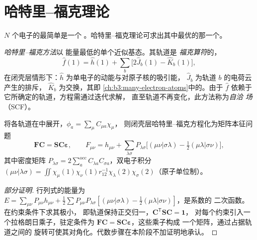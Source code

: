 \section{哈特里–福克理论}

$N$ 个电子的最简单是一个
。哈特里–福克理论可求出其中最优的那一个。

\begin{definition}\label{def:b3:computational-chemistry:hartree-fock}
\emph{哈特里–福克方法}以
能量最低的单个近似基态。其轨道是
\emph{福克算符}的，
\[
\hat f(1) = \hat h(1) + \sum_b\big[2\hat J_b(1) - \hat K_b(1)\big],
\]
在闭壳层情形下：$\hat h$ 为单电子的动能与对原子核的吸引能，
$\hat J_b$ 为轨道 $b$ 的电荷云产生的排斥，
$\hat K_b$ 为交换，其即
\cref{ch:b3:many-electron-atoms}中的。由于 $\hat f$
依赖于它所确定的轨道，方程需通过迭代求解，
直至轨道不再变化，此方法称为\emph{自洽
场}（SCF）。
\end{definition}

\begin{theorem}\label{thm:b3:computational-chemistry:roothaan}
将各轨道在中展开，$\phi_a = \sum_\mu C_{\mu a}\chi_\mu$，
则闭壳层哈特里–福克方程化为矩阵本征问题
\[
\mathbf F\mathbf C = \mathbf S\mathbf C\boldsymbol\varepsilon, \qquad F_{\mu\nu} =
h_{\mu\nu} + \sum_{\lambda\sigma}P_{\lambda\sigma}\big[(\mu\nu|\sigma\lambda) -
\tfrac12(\mu\lambda|\sigma\nu)\big],
\]
其中密度矩阵 $P_{\lambda\sigma} = 2\sum_a^{\mathrm{occ}}C_{\lambda a}C_{\sigma
a}$，双电子积分 $(\mu\nu|\lambda\sigma) = \iint\chi_\mu(1)\chi_\nu(1)
r_{12}^{-1}\chi_\lambda(2)\chi_\sigma(2)$（原子单位制）。
\end{theorem}

\begin{proof}[部分证明]
行列式的能量为 $E = \sum_{\mu\nu}P_{\mu\nu}h_{\mu\nu} + \frac12
\sum P_{\mu\nu}P_{\lambda\sigma}[(\mu\nu|\sigma\lambda) - \frac12(\mu\lambda|\sigma\nu)]$，是系数的
二次函数。在约束条件下求其极小，
即轨道保持正交归一，$\mathbf C^{\mathsf T}\mathbf S\mathbf C = \mathbf 1$，
对每个约束引入一个拉格朗日乘子，驻定条件为
$\mathbf F\mathbf C = \mathbf S\mathbf C\boldsymbol\varepsilon$，这些乘子构成
一个矩阵，通过占据轨道之间的
旋转可使其对角化。代数步骤在本阶段不加证明地承认。
\end{proof}

